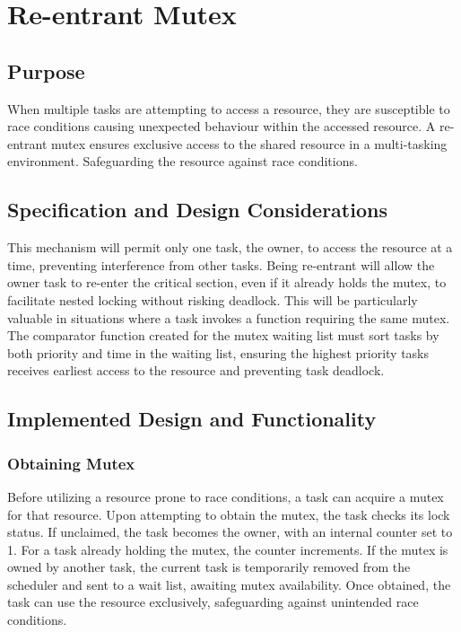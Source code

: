 \section{Re-entrant Mutex}
\subsection{Purpose}
When multiple tasks are attempting to access a resource, they are susceptible to race conditions causing unexpected behaviour within the accessed resource. A re-entrant mutex ensures exclusive access to the shared resource in a multi-tasking environment. Safeguarding the resource against race conditions.
\subsection{Specification and Design Considerations}
This mechanism will permit only one task, the owner, to access the resource at a time, preventing interference from other tasks. Being re-entrant will allow the owner task to re-enter the critical section, even if it already holds the mutex, to facilitate nested locking without risking deadlock. This will be particularly valuable in situations where a task invokes a function requiring the same mutex.\hfill\newline
The comparator function created for the mutex waiting list must sort tasks by both priority and time in the waiting list, ensuring the highest priority tasks receives earliest access to the resource and preventing task deadlock.


\subsection{Implemented Design and Functionality}
\subsubsection{Obtaining Mutex}
Before utilizing a resource prone to race conditions, a task can acquire a mutex for that resource. Upon attempting to obtain the mutex, the task checks its lock status. If unclaimed, the task becomes the owner, with an internal counter set to 1. For a task already holding the mutex, the counter increments. If the mutex is owned by another task, the current task is temporarily removed from the scheduler and sent to a wait list, awaiting mutex availability. Once obtained, the task can use the resource exclusively, safeguarding against unintended race conditions.

